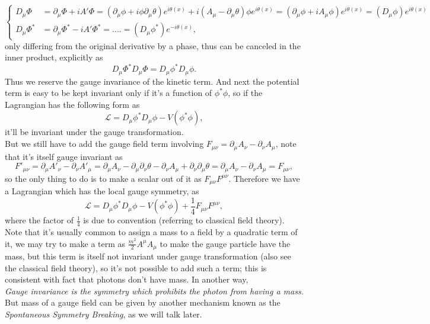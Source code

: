 \documentclass{article}
\newcommand{\be}{\begin{equation}}
\newcommand{\ee}{\end{equation}}
\newcommand{\p}{\partial}
\renewcommand{\1}{\left}
\renewcommand{\2}{\right}
\newcommand{\ma}{\mathcal}
\newcommand{\m}{\mu}
\newcommand{\n}{\nu}
\renewcommand{\th}{\theta}
\begin{document}
\be\1\{\begin{split}
D_\m \Phi&=\p_\m \Phi +iA'\Phi =\1(\p_\m\phi+i\phi\p_\m\th\2)e^{i\th(x)}+i\1(A_\m-\p_\m\th\2)\phi e^{i\th(x)}=\1(\p_\m\phi+iA_\m\phi\2)e^{i\th(x)}=(D_\m\phi) e^{i\th(x)}\\
D_\m \Phi^*&=\p_\m \Phi^* -iA'\Phi^* =....=(D_\m\phi^*) e^{-i\th(x)},
\end{split}\2.\ee
only differing from the original derivative by a phase, thus can be canceled in the inner product, explicitly as
\be
D_\m \Phi^*D_\m \Phi=D_\m \phi^*D_\m \phi.
\ee
Thus we reserve the gauge invariance of the kinetic term. And next the potential term is easy to be kept invariant only if it's a function of $\phi^*\phi$, so if the Lagrangian has the following form as
\be \ma L=D_\m \phi^*D_\m \phi-V(\phi^*\phi), \ee
it'll be invariant under the gauge transformation.\\
But we still have to add the gauge field term involving $F_{\m\n}=\p_\m A_\n-\p_\n A_\m$, note that it's itself gauge invariant as
\be F'_{\m\n}=\p_\m A'_\n-\p_\n A'_\m=\p_\m A_\n-\p_\m\p_\n\th-\p_\n A_\m+\p_\n\p_\m\th=\p_\m A_\n-\p_\n A_\m=F_{\m\n}, \ee
so the only thing to do is to make a scalar out of it as $F_{\m\n}F^{\m\n}$. Therefore we have a Lagrangian which has the local gauge symmetry, as
\be \ma L=D_\m \phi^*D_\m \phi-V(\phi^*\phi)+\frac 1 4 F_{\m\n}F^{\m\n}, \ee
where the factor of $\frac 1 4$ is due to convention (referring to classical field theory). Note that it's usually common to assign a mass to a field by a quadratic term of it, we may try to make a term as $\frac {m^2} 2 A^\m A_\m$ to make the gauge particle have the mass, but this term is itself not invariant under gauge transformation (also see the classical field theory), so it's not possible to add such a term; this is consistent with fact that photons don't have mass. In another way,\\

\textit{Gauge invariance is the symmetry which prohibits the photon from having a mass.}\\

 But mass of a gauge field can be given by another mechanism known as the \textit{Spontaneous Symmetry Breaking}, as we will talk later.
 
\end{document}
